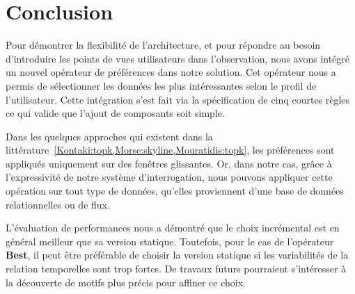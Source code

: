 \section{Conclusion}
Pour démontrer la flexibilité de l'architecture, et pour répondre au besoin d'introduire les points de vues utilisateurs dans l'observation, nous avons intégré un nouvel opérateur de préférences dans notre solution. Cet opérateur nous a permis de sélectionner les données les plus intéressantes selon le profil de l'utilisateur. Cette intégration s'est fait via la spécification de cinq courtes règles ce qui valide que l'ajout de composants soit simple.

Dans les quelques approches qui existent dans la littérature~\ref{Kontaki:topk,Morse:skyline,Mouratidis:topk}, les préférences sont appliqués uniquement sur des fenêtres glissantes. Or, dans notre cas, grâce à l'expressivité de notre système d'interrogation, nous pouvons appliquer cette opération sur tout type de données, qu'elles proviennent d'une base de données relationnelles ou de flux.

L'évaluation de performances nous a démontré que le choix incrémental est en général meilleur que sa version statique. Toutefois, pour le cas de l'opérateur \textbf{Best}, il peut être préférable de choisir la version statique si les variabilités de la relation temporelles sont trop fortes. De travaux futurs pourraient s'intéresser à la découverte de motifs plus précis pour affiner ce choix.
